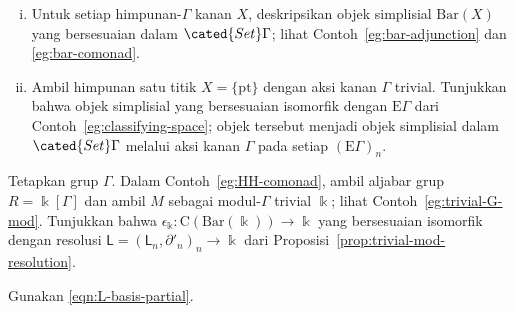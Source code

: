 \begin{Exercises}
\begin{enumerate}[(i)]
		\begin{hint}
			Funktor $\mathrm{F}$ memetakan himpunan $X$ ke $X\times\Gamma$,
			dengan $\Gamma$ bekerja melalui perkalian kanan pada komponen kedua.
			Morfisme unit adalah $x\mapsto(x,1)$, sedangkan morfisme kounit
			adalah peta aksi.
		\end{hint}
		\item Untuk setiap himpunan-$\Gamma$ kanan $X$, deskripsikan objek
		simplisial $\mathrm{Bar}(X)$ yang bersesuaian dalam
		$\cated{Set}\Gamma$; lihat Contoh~\ref{eg:bar-adjunction} dan
		\ref{eg:bar-comonad}.
		\item Ambil himpunan satu titik $X=\{\mathrm{pt}\}$ dengan aksi kanan
		$\Gamma$ trivial. Tunjukkan bahwa objek simplisial yang bersesuaian
		isomorfik dengan $\mathrm{E}\Gamma$ dari
		Contoh~\ref{eg:classifying-space}; objek tersebut menjadi objek
		simplisial dalam $\cated{Set}\Gamma$ melalui aksi kanan $\Gamma$ pada
		setiap $(\mathrm{E}\Gamma)_n$.
	\end{enumerate}

	\item Tetapkan grup $\Gamma$. Dalam Contoh~\ref{eg:HH-comonad}, ambil
	aljabar grup $R=\Bbbk[\Gamma]$ dan ambil $M$ sebagai modul-$\Gamma$
	trivial $\Bbbk$; lihat Contoh~\ref{eg:trivial-G-mod}. Tunjukkan bahwa
	$\epsilon_{\Bbbk}:\mathrm{C}(\mathrm{Bar}(\Bbbk))\to\Bbbk$ yang
	bersesuaian isomorfik dengan resolusi
	$\mathsf{L}=(\mathsf{L}_n,\partial'_n)_n\to\Bbbk$ dari
	Proposisi~\ref{prop:trivial-mod-resolution}.
	\begin{hint}
		Gunakan \eqref{eqn:L-basis-partial}.
	\end{hint}


\end{Exercises}

